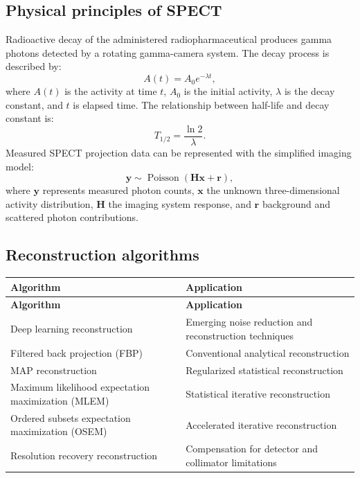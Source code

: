 \subsection{Physical principles of SPECT}
Radioactive decay of the administered radiopharmaceutical produces gamma photons detected by a rotating gamma-camera system. The decay process is described by:
\begin{equation}
A(t)=A_0 e^{-\lambda t},
\end{equation}
where $A(t)$ is the activity at time $t$, $A_0$ is the initial activity, $\lambda$ is the decay constant, and $t$ is elapsed time. The relationship between half-life and decay constant is:
\begin{equation}
T_{1/2}=\frac{\ln 2}{\lambda}.
\end{equation}
Measured SPECT projection data can be represented with the simplified imaging model:
\begin{equation}
\mathbf{y}\sim\operatorname{Poisson}(\mathbf{H}\mathbf{x}+\mathbf{r}),
\end{equation}
where $\mathbf{y}$ represents measured photon counts, $\mathbf{x}$ the unknown three-dimensional activity distribution, $\mathbf{H}$ the imaging system response, and $\mathbf{r}$ background and scattered photon contributions.

\subsection{Reconstruction algorithms}
\begin{longtable}{@{}p{}p{}@{}}
\toprule
\textbf{Algorithm} & \textbf{Application} \\
\midrule
\endfirsthead
\toprule
\textbf{Algorithm} & \textbf{Application} \\
\midrule
\endhead
Deep learning reconstruction & Emerging noise reduction and reconstruction techniques \\
Filtered back projection (FBP) & Conventional analytical reconstruction \\
MAP reconstruction & Regularized statistical reconstruction \\
Maximum likelihood expectation maximization (MLEM) & Statistical iterative reconstruction \\
Ordered subsets expectation maximization (OSEM) & Accelerated iterative reconstruction \\
Resolution recovery reconstruction & Compensation for detector and collimator limitations \\
\bottomrule
\end{longtable}


